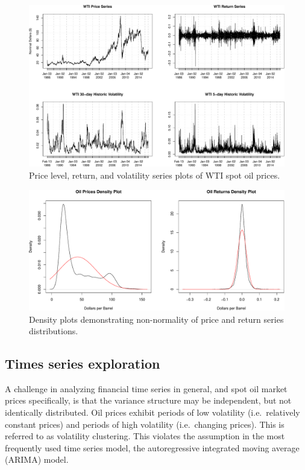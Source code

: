 \documentclass[11pt,]{article}
\begin{document}
\begin{figure}[htbp]
\centering
\includegraphics{Figs/unnamed-chunk-4-1.pdf}
\caption{Price level, return, and volatility series plots of WTI spot
oil prices.}
\end{figure}

\begin{figure}[htbp]
\centering
\includegraphics{Figs/unnamed-chunk-5-1.pdf}
\caption{Density plots demonstrating non-normality of price and return
series distributions.}
\end{figure}

\subsection{Times series exploration}\label{times-series-exploration}

A challenge in analyzing financial time series in general, and spot oil
market prices specifically, is that the variance structure may be
independent, but not identically distributed. Oil prices exhibit periods
of low volatility (i.e.~relatively constant prices) and periods of high
volatility (i.e.~changing prices). This is referred to as volatility
clustering. This violates the assumption in the most frequently used
time series model, the autoregressive integrated moving average (ARIMA)
model.
\end{document}

